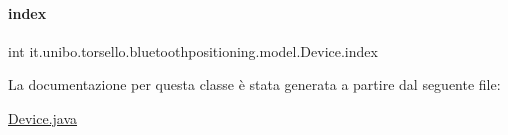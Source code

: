 \hypertarget{classit_1_1unibo_1_1torsello_1_1bluetoothpositioning_1_1model_1_1Device_a55a01164b2388451f5e8344bfbc61ccc_a55a01164b2388451f5e8344bfbc61ccc}{}\label{classit_1_1unibo_1_1torsello_1_1bluetoothpositioning_1_1model_1_1Device_a55a01164b2388451f5e8344bfbc61ccc_a55a01164b2388451f5e8344bfbc61ccc} 
\paragraph{\texorpdfstring{index}{index}}
{\footnotesize\ttfamily int it.\+unibo.\+torsello.\+bluetoothpositioning.\+model.\+Device.\+index\hspace{0.3cm}{\ttfamily [private]}}



La documentazione per questa classe è stata generata a partire dal seguente file\+:\begin{DoxyCompactItemize}
\item 
\hyperlink{Device_8java}{Device.\+java}\end{DoxyCompactItemize}
